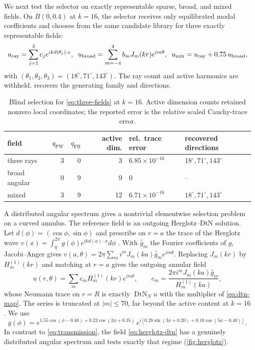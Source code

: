 \documentclass[11pt]{article}
\newcommand{\ii}{i}
\newcommand{\PW}{\mathrm{PW}}
\newcommand{\FB}{\mathrm{FB}}
\newcommand{\DtN}{\operatorname{DtN}}
\numberwithin{equation}{section}
\begin{document}
We next test the selector on exactly representable sparse, broad, and mixed fields.
On $B(0,0.4)$ at $k=16$, the selector receives only equilibrated modal coefficients and chooses from the same candidate library for three exactly representable fields:
\begin{equation}\label{eq:three-fields}
 u_{\rm ray}=\sum_{j=1}^3c_je^{\ii kd(\theta_j)\cdot x},\;\;
 u_{\rm broad}=\sum_{m=-4}^4b_mJ_m(kr)e^{\ii m\theta},\;\;
 u_{\rm mix}=u_{\rm ray}+0.75\,u_{\rm broad},
\end{equation}
with $(\theta_1,\theta_2,\theta_3)=(18^\circ,71^\circ,143^\circ)$.
The ray count and active harmonics are withheld.   recovers the generating family and directions.

\begin{table}[htbp]
\centering
\caption{Blind selection for \eqref{eq:three-fields} at $k=16$.  Active dimension counts retained nonzero local coordinates; the reported error is the relative scaled Cauchy-trace error.}
\label{tab:selection}
\footnotesize
\begin{tabular}{lrrrll}
\toprule
field & $q_{\PW}$ & $q_{\FB}$ & active dim. & rel.\ trace error & recovered directions\\
\midrule
three rays & 3 & 0 & 3 & $6.85\times10^{-16}$ & $18^\circ,71^\circ,143^\circ$\\
broad angular & 0 & 9 & 9 & $0$ & --\\
mixed & 3 & 9 & 12 & $6.71\times10^{-16}$ & $18^\circ,71^\circ,143^\circ$\\
\bottomrule
\end{tabular}
\end{table}




A distributed angular spectrum gives a nontrivial elementwise selection problem on a curved annulus.
The reference field is an outgoing Herglotz--DtN solution.
Let $d(\phi)=(\cos\phi,\sin\phi)$ and prescribe on $r=a$ the trace of the Herglotz wave $v(x)=\int_0^{2\pi}g(\phi)e^{\ii kd(\phi)\cdot x}d\phi$ \citep{ColtonKress2001,ColtonKressBook}.  With $\widehat g_m$ the Fourier coefficients of $g$, Jacobi--Anger gives $v(a,\theta)=2\pi\sum_m\ii^mJ_m(ka)\widehat g_me^{\ii m\theta}$.  Replacing $J_m(kr)$ by $H_m^{(1)}(kr)$ and matching at $r=a$ gives the outgoing annular field
\begin{equation}\label{eq:herglotz-dtn}
 u(r,\theta)=\sum_{m}c_mH_m^{(1)}(kr)e^{\ii m\theta},\qquad
 c_m=\frac{2\pi\ii^mJ_m(ka)\widehat g_m}{H_m^{(1)}(ka)},
\end{equation}
whose Neumann trace on $r=R$ is exactly $\DtN_Nu$ with the multiplier of \eqref{eq:dtn-map}.  The series is truncated at $|m|\le70$, far beyond the active content at $k=16$.  We use
\begin{equation}\label{eq:density}
 g(\phi)=e^{1.55\cos(\phi-0.48)+0.22\cos(2\phi+0.35)}\,
 e^{\ii[0.28\sin(3\phi+0.20)+0.10\cos(5\phi-0.40)]}.
\end{equation}
In contrast to \eqref{eq:transmission}, the field \eqref{eq:herglotz-dtn} has a genuinely distributed angular spectrum and tests exactly that regime (\cref{fig:herglotz}).
\end{document}
